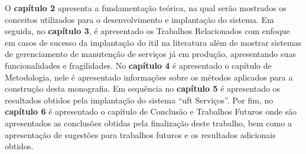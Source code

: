 \noindent O \textbf{capítulo 2} apresenta a fundamentação teórica, na qual serão mostrados os conceitos utilizados para o desenvolvimento e implantação do sistema. Em seguida, no \textbf{capítulo 3}, é apresentado os Trabalhos Relacionados com enfoque em casos de sucesso da implantação do \gls{itil} na literatura além de mostrar sistemas de gerenciamento de manutenção de serviços já em produção, apresentando suas funcionalidades e fragilidades.  No \textbf{capítulo 4} é apresentado o capítulo de Metodologia, nele é apresentado informações sobre os métodos aplicados para a construção desta monografia. Em sequência no \textbf{capítulo 5} é apresentado os resultados obtidos pela implantação do sistema ``\acrshort{uft} Serviços''.
Por fim, no \textbf{capítulo 6} é apresentado o capítulo de Conclusão e Trabalhos Futuros onde são apresentados as conclusões obtidas pela finalização deste trabalho, bem como a apresentação de sugestões para trabalhos futuros e os resultados adicionais obtidos.